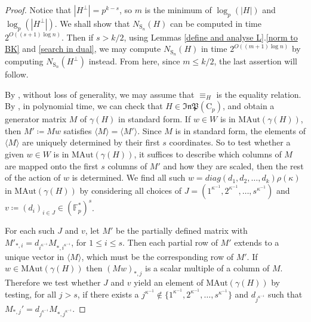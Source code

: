 \documentclass[11pt,a4paper]{article}
\theoremstyle{definition}
\theoremstyle{remark}
\newcommand{\InP}{\mathfrak{InP}}
\newcommand{\MAut}{\mathrm{MAut}}
\newcommand{\Sy}{\mathrm{S}}
\newcommand{\Cy}{\mathrm{C}}
\begin{document}
\begin{proof}
Notice that $|H^{\bot}| = p^{k-s}$, so $m$ is the minimum of $\log_p(|H|)$ and $\log_p(|H^{\bot}|)$. 
We shall show that $N_{\Sy_n}(H)$ can be computed in time $2^{O((s+1) \log{n} )}$.  
Then if $s>k/2$, using Lemmas \ref{define and analyse L}.\ref{norm to BK} and \ref{search in dual}, we may compute $N_{\Sy_n}(H)$ in time $2^{O((m+1) \log{n})}$ by computing $N_{\Sy_n}(H^{\bot})$ instead. 
From here, since $m \leq k/2$, the last assertion will follow. 

By , without loss of generality, we may assume that $\equiv_H$ is the equality relation. 
By , in polynomial time, we can check that $H \in \InP(\Cy_p)$, and obtain a generator matrix $M$ of $\gamma(H)$ in standard form. 
If $w \in W$ is in $\MAut(\gamma(H))$, then $M' \coloneqq Mw$ satisfies $\langle M \rangle = \langle M' \rangle$. 
Since $M$ is in standard form, the elements of $\langle M \rangle$ are uniquely determined by their first $s$ coordinates.
So to test whether a given $w \in W$ is in $\MAut(\gamma(H))$, it suffices to describe which columns of $M$ are mapped onto the first $s$ columns of $M'$ and how they are scaled, then the rest of the action of $w$ is determined.  We find all such $w  = diag(d_1, d_2, \ldots, d_k) \rho(\kappa)$ in $\MAut(\gamma(H))$ by considering all choices of $J = (1^{\kappa^{-1}}, 2^{\kappa^{-1}}, \ldots, s^{\kappa^{-1}}) $ and $v \coloneqq (d_i)_{i \in J} \in (\mathds{F}_p^*)^s$. 

For each such $J$ and $v$, let $M'$ be the partially defined matrix with $M'_{*, i}=d_{i^{\kappa^{-1}}} M_{*, i^{\kappa^{-1}}}$, for $1 \leq i \leq s$. Then each partial row of $M'$ extends to a unique vector in $\langle M \rangle$, which must be the corresponding row of $M'$. 
If $w \in \MAut(\gamma(H))$ then $(Mw)_{*,j}$ is a scalar multiple of a column of $M$. 
Therefore we test whether $J$ and $v$ yield an element of $\MAut(\gamma(H))$ by testing, for all $j >s$, if there exists a $j^{\kappa^{-1}} \not \in \{1^{\kappa^{-1}}, 2^{\kappa^{-1}}, \ldots, s^{\kappa^{-1}} \}$ and $d_{j^{\kappa^{-1}}}$ such that $M_{*,j}' = d_{j^{\kappa^{-1}}} M_{*, j^{\kappa^{-1}}}$.  


\end{proof}
\end{document}
